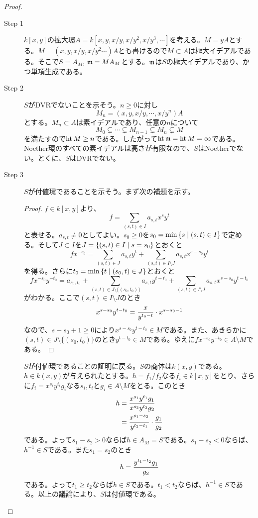 \begin{proof} ${}$
\begin{description}
  \item[Step 1] $k[x,y]$の拡大環$A=k[x,y, x/y, x/y^2 , x/y^3 , \cdots ]$を考える。$M=yA$とする。$M=(x,y , x/y, x/y^2 \cdots )A$とも書けるので$M \subset A$は極大イデアルである。そこで$S = A_M$, $\mathfrak{m} = M A_M$とする。$\mathfrak{m}$は$S$の極大イデアルであり、かつ単項生成である。
  \item[Step 2] $S$がDVRでないことを示そう。$n \geq 0$に対し
  \[
  M_n = (x,y,x/y , \cdots , x/y^n)A
  \]
  とする。$M_n \subset A$は素イデアルであり、任意の$n$について
  \[
  M_0 \subsetneq \cdots \subsetneq M_{n-1} \subsetneq M_n \subsetneq M
  \]
  を満たすので$\operatorname{ht} M \geq n$である。したがって$\operatorname{ht} \mathfrak{m} = \operatorname{ht} M = \infty$である。Noether環のすべての素イデアルは高さが有限なので、$S$はNoetherでない。とくに、$S$はDVRでない。
  \item[Step 3] $S$が付値環であることを示そう。まず次の補題を示す。
\begin{proof}
  $f \in k[x,y]$より、
\[
f = \sum_{(s,t) \in I} a_{s,t} x^s y^t
\]
と表せる。$a_{s,t} \neq 0$としてよい。$s_0 \geq 0$を$s_0 = \min \left\{ s \mathrel{} \middle| \mathrel{} (s,t) \in I \right\}$で定める。そして$J \subset I$を$J = \left\{ (s,t) \in I \mathrel{} \middle| \mathrel{} s=s_0 \right\}$とおくと
  \[
  f x^{-s_0} = \sum_{(s,t) \in J} a_{s,t} y^t + \sum_{(s,t) \in I \setminus J} a_{s,t} x^{s-s_0} y^t
  \]
  を得る。さらに$t_0 = \min \left\{ t \mathrel{} \middle| \mathrel{} (s_0,t) \in J \right\}$とおくと
  \[
  f x^{-s_0} y^{-t_0} = a_{s_0,t_0 } + \sum_{(s,t) \in J \setminus \{(s_0, t_0)\}} a_{s,t} y^{t-t_0} +  \sum_{(s,t) \in I \setminus J} a_{s,t} x^{s-s_0} y^{t-t_0}
  \]
  がわかる。ここで$(s,t) \in I \setminus J$のとき
  \[
   x^{s-s_0} y^{t-t_0} = \frac{x}{y^{t_0 - t}} \cdot x^{s-s_0-1}
  \]
  なので、$s-s_0 + 1 \geq 0$により$ x^{s-s_0} y^{t-t_0} \in M$である。また、あきらかに$(s,t) \in J \setminus \{(s_0, t_0)\}$のとき$y^{t-t_0} \in M$である。ゆえに$f x^{-s_0} y^{-t_0} \in A \setminus M$である。
\end{proof}
$S$が付値環であることの証明に戻る。$S$の商体は$k(x,y)$である。$h \in k(x,y)$が与えられたとする。$h=f_1 / f_2$なる$f_i \in k[x,y]$をとり、さらに$f_i = x^{s_i} y^{t_i} g_i$なる$s_i, t_i$と$g_i \in A \setminus M$をとる。このとき
\begin{align*}
  h &= \frac{x^{s_1} y^{t_1} g_1  }{ x^{s_2} y^{t_2} g_2 } \\
  &= \frac{ x^{s_1 - s_2} }{ y^{t_2 - t_1} } \cdot \frac{g_1}{g_2}
\end{align*}
である。よって$s_1 - s_2 > 0$ならば$h \in A_M = S$である。$s_1 - s_2 < 0$ならば、$h^{-1} \in S$である。また$s_1 = s_2$のとき
\[
h = \frac{y^{t_1 - t_2} g_1}{g_2}
\]
である。よって$t_1 \geq t_2$ならば$h \in S$である。$t_1 < t_2$ならば、$h^{-1} \in S$である。以上の議論により、$S$は付値環である。
\end{description}
\end{proof}



